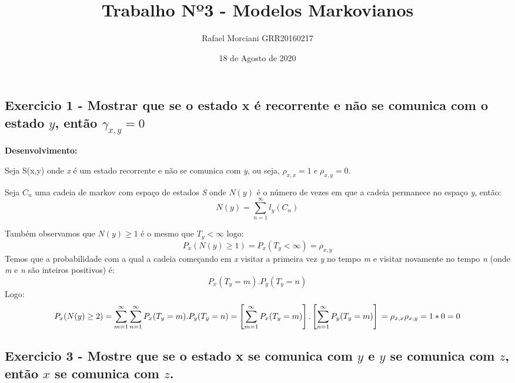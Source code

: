 \documentclass[
]{article}
\title{Trabalho Nº3 - Modelos Markovianos}
\author{Rafael Morciani \textbar{} GRR20160217}
\date{18 de Agosto de 2020}
\begin{document}
\maketitle


\hypertarget{exercicio-1---mostrar-que-se-o-estado-x-uxe9-recorrente-e-nuxe3o-se-comunica-com-o-estado-y-entuxe3o-ux3b3_xy0}{%
\subsection{\texorpdfstring{Exercicio 1 - Mostrar que se o estado x é
recorrente e não se comunica com o estado \(y\), então
\(γ_{x,y}=0\)}{Exercicio 1 - Mostrar que se o estado x é recorrente e não se comunica com o estado y, então γ\_\{x,y\}=0}}\label{exercicio-1---mostrar-que-se-o-estado-x-uxe9-recorrente-e-nuxe3o-se-comunica-com-o-estado-y-entuxe3o-ux3b3_xy0}}

\textbf{Desenvolvimento:}

Seja S(x,y) onde \emph{x} é um estado recorrente e não se comunica com
\emph{y}, ou seja, \(\rho_{x,x}=1 \;e \; \rho_{x,y}=0\).

Seja \(C_{n}\) uma cadeia de markov com espaço de estados \emph{S} onde
\(N(y)\) é o número de vezes em que a cadeia permanece no espaço
\emph{y}, então: \[N(y)=\sum_{n=1}^{\infty}l_{y}(C_{n})\]

Também observamos que \(N(y)\geq 1\) é o mesmo que \(T_{y}<\infty\)
logo: \[P_{x}(N(y)\geq1)=P_{x}(T_{y}<\infty)=\rho_{x,y}\] Temos que a
probabilidade com a qual a cadeia começando em \emph{x} visitar a
primeira vez \emph{y} no tempo \emph{m} e visitar novamente no tempo
\emph{n} (onde \emph{m} e \emph{n} são inteiros positivos) é:
\[P_{x}(T_{y}=m).P_{y}(T_{y}=n)\] Logo:
\[P_{x}(N(y)\geq2)=\sum_{m=1}^{\infty}\sum_{n=1}^{\infty}P_{x}(T_{y}=m).P_{y}(T_{y}=n)\\
=\left [ \sum_{m=1}^{\infty}P_{x}(T_{y}=m) \right ].\left [ \sum_{n=1}^{\infty}P_{y}(T_{y}=m) \right ]\\
=\rho_{x,x}\rho_{x,y}=1*0=0\]

\pagebreak

\hypertarget{exercicio-3---mostre-que-se-o-estado-x-se-comunica-com-y-e-y-se-comunica-com-z-entuxe3o-x-se-comunica-com-z.}{%
\subsection{\texorpdfstring{Exercicio 3 - Mostre que se o estado x se
comunica com \(y\) e \(y\) se comunica com \(z\), então \(x\) se
comunica com
\(z\).}{Exercicio 3 - Mostre que se o estado x se comunica com y e y se comunica com z, então x se comunica com z.}}\label{exercicio-3---mostre-que-se-o-estado-x-se-comunica-com-y-e-y-se-comunica-com-z-entuxe3o-x-se-comunica-com-z.}}
\end{document}
